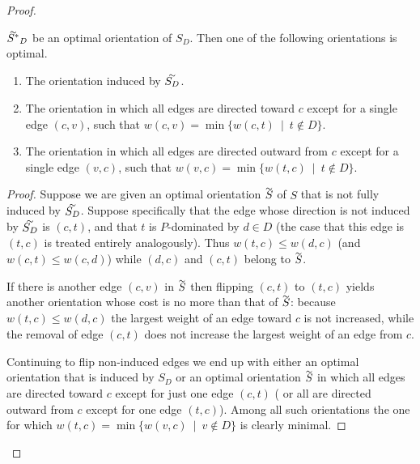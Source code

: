 \begin{proof}
\begin{lemma}
$\tildeb{S^*}_D$ be an optimal orientation of $S_D$. Then one of the following
orientations is optimal.
\begin{enumerate}
	\item The orientation induced by $\tildeb{S_D}$.
	\item The orientation in which all edges are directed toward $c$ except for a 
	single edge $(c,v)$, such that 
	$w(c,v)=\min \{w(c,t)\ \mid \ t \notin D \}$.
	\item The orientation in which all edges are directed outward from $c$ except for a 
	single edge $(v,c)$, such that 
	$w(v,c)=\min \{w(t,c)\ \mid \ t \notin D \}$.
\end{enumerate}
\begin{proof}
	Suppose we are given an optimal	orientation $\tildeb{S}$ of $S$ that is not fully
	induced by $\tildeb{S_D}$. Suppose specifically that the edge 
	whose direction is not induced by $\tildeb{S_D}$ is $(c,t)$, and
	that $t$ is $P$-dominated by $d \in D$ 
	(the case that this edge is $(t,c)$ is treated
	entirely analogously). 
	Thus $w(t,c)\leq w(d,c)$ (and $w(c,t)\leq w(c,d)$) while $(d,c)$ and $(c,t)$ belong to $\tildeb{S}$. 

If there is another edge $(c,v)$ in $\tildeb{S}$ then flipping $(c,t)$ to $(t,c)$
yields another orientation whose cost is no more than that of $\tildeb{S}$:
because $w(t,c)\leq w(d,c)$ the largest weight of an edge toward $c$ is not increased,
while the removal of edge $(c,t)$ does not increase the largest weight of an edge 
from $c$.
	
	Continuing to flip non-induced edges we end up with either an optimal orientation
	that is induced by $S_D$ or an optimal orientation $\tildeb{S}$
	in which all edges are directed toward $c$ except for just
	one edge $(c,t)$ ( or all are directed outward from $c$ except for  
	one edge $(t,c)$). Among all such orientations the one for which 
	$w(t,c)=\min \{w(v,c)\ \mid \ v \notin D \}$ is clearly minimal.	
\end{proof}

\end{lemma}


\end{proof}
